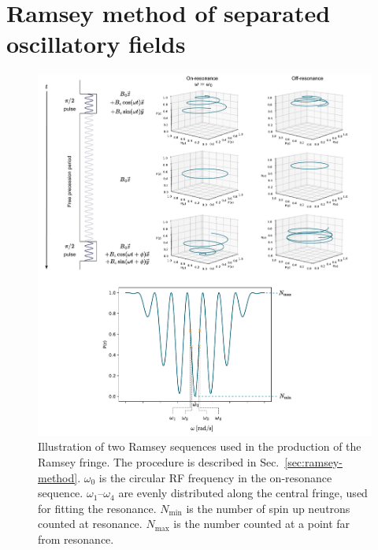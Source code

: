 
\section{Ramsey method of separated oscillatory fields\label{sec:ramsey-method}}


\begin{figure}[htp]
    \centering
    \includegraphics[width=\textwidth]{figures/ramsey_sequence.pdf}
    \caption[Illustration of two Ramsey sequences used in the production of the Ramsey fringe. The procedure is described in Sec.~\ref{sec:ramsey-method}]
    {Illustration of two Ramsey sequences used in the production of the Ramsey fringe. The procedure is described in Sec.~\ref{sec:ramsey-method}. $\omega_0$ is the circular RF frequency in the on-resonance sequence. $\omega_1$--$\omega_4$ are evenly distributed along the central fringe, used for fitting the resonance. $N_\text{min}$ is the number of spin up neutrons counted at resonance. $N_\text{max}$ is the number counted at a point far from resonance.}
    \label{fig:ramsey-sequence}
\end{figure}

